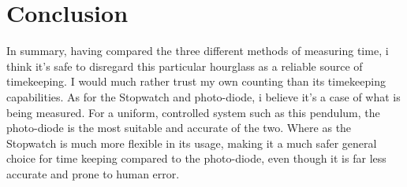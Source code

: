 \documentclass[%
 reprint,
 amsmath,amssymb,
 aps,
]{revtex4-1}
\begin{document}
\section{Conclusion}
	In summary, having compared the three different methods of measuring time, i think it's safe to disregard this particular hourglass as a reliable source of timekeeping. I would much rather trust my own counting than its timekeeping capabilities. As for the Stopwatch and photo-diode, i believe it's a case of what is being measured. For a uniform, controlled system such as this pendulum, the photo-diode is the most suitable and accurate of the two. Where as the Stopwatch is much more flexible in its usage, making it a much safer general choice for time keeping compared to the photo-diode, even though it is far less accurate and prone to human error.


\end{document}
